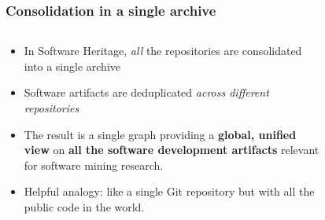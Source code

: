 \documentclass[aspectratio=169,xcolor=table]{beamer}
\begin{document}
    \begin{frame}
        \frametitle{Consolidation in a single archive}

        \begin{columns}
            \begin{block}{}
                \begin{itemize}
                    \item In Software Heritage, \emph{all} the repositories are
                        consolidated into a single archive
                    \item Software artifacts are deduplicated \emph{across
                        different repositories}
                    \item The result is a single graph providing a
                        \textbf{global, unified view} on \textbf{all the
                        software development artifacts} relevant for software
                        mining research.
                    \item Helpful analogy: like a single Git repository but
                        with all the public code in the world.
                \end{itemize}
            \end{block}
            \begin{figure}
                \centering
                \scalebox{0.4}{}
            \end{figure}
        \end{columns}
    \end{frame}
\end{document}
